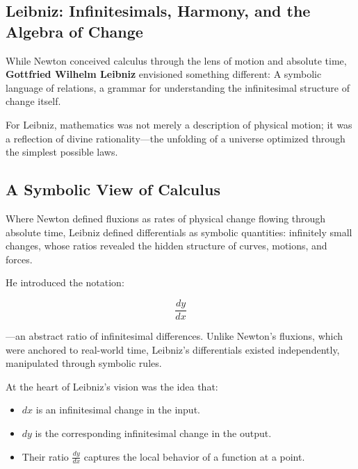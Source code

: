 \subsection{Leibniz: Infinitesimals, Harmony, and the Algebra of Change}

While Newton conceived calculus through the lens of motion and absolute time, \textbf{Gottfried Wilhelm Leibniz} envisioned something different:  
A symbolic language of relations, a grammar for understanding the infinitesimal structure of change itself.

For Leibniz, mathematics was not merely a description of physical motion; it was a reflection of divine rationality—the unfolding of a universe optimized through the simplest possible laws.





\subsection{A Symbolic View of Calculus}

Where Newton defined fluxions as rates of physical change flowing through absolute time, Leibniz defined 
differentials as symbolic quantities: infinitely small changes, whose ratios revealed the hidden structure of 
curves, motions, and forces.

He introduced the notation:

\[
\frac{dy}{dx}
\]

—an abstract ratio of infinitesimal differences. Unlike Newton’s fluxions, which were anchored to real-world time, 
Leibniz's differentials existed independently, manipulated through symbolic rules.

At the heart of Leibniz’s vision was the idea that:

\begin{itemize}
    \item \( dx \) is an infinitesimal change in the input.
    \item \( dy \) is the corresponding infinitesimal change in the output.
    \item Their ratio \( \frac{dy}{dx} \) captures the local behavior of a function at a point.
\end{itemize}

